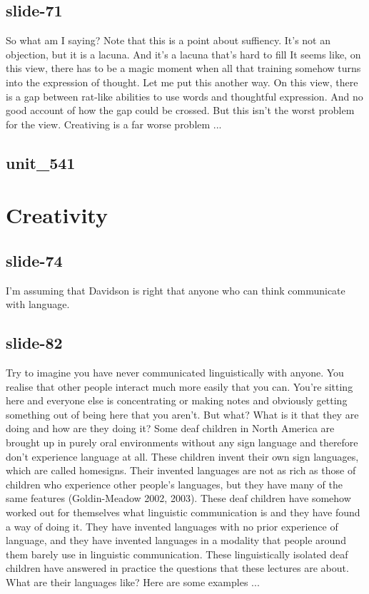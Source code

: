 \documentclass[12pt,\papersize]{extarticle}
\begin{document}
 
\subsection{slide-71}
So what am I saying?
Note that this is a point about suffiency. It's not an objection, but it is a lacuna.
And it's a lacuna that's hard to fill
It seems like, on this view, there has to be a magic moment when all that training somehow turns into the expression of thought.
Let me put this another way.
On this view, there is a gap between rat-like abilities to use words and thoughtful expression.
And no good account of how the gap could be crossed.
But this isn't the worst problem for the view. Creativing is a far worse problem ...
 
 
\subsection{unit\_541}
 
\section{Creativity}
 
 
\subsection{slide-74}
I'm assuming that Davidson is right that anyone who can think communicate with language.
 
 
\subsection{slide-82}
Try to imagine you have never communicated linguistically with anyone. You realise that other people interact much more easily that you can. You're sitting here and everyone else is concentrating or making notes and obviously getting something out of being here that you aren't. But what? What is it that they are doing and how are they doing it?
Some deaf children in North America are brought up in purely oral environments without any sign language and therefore don't experience language at all. These children invent their own sign languages, which are called homesigns. Their invented languages are not as rich as those of children who experience other people's languages, but they have many of the same features (Goldin-Meadow 2002, 2003). These deaf children have somehow worked out for themselves what linguistic communication is and they have found a way of doing it. They have invented languages with no prior experience of language, and they have invented languages in a modality that people around them barely use in linguistic communication. These linguistically isolated deaf children have answered in practice the questions that these lectures are about.
What are their languages like? Here are some examples ...
 
\end{document}
